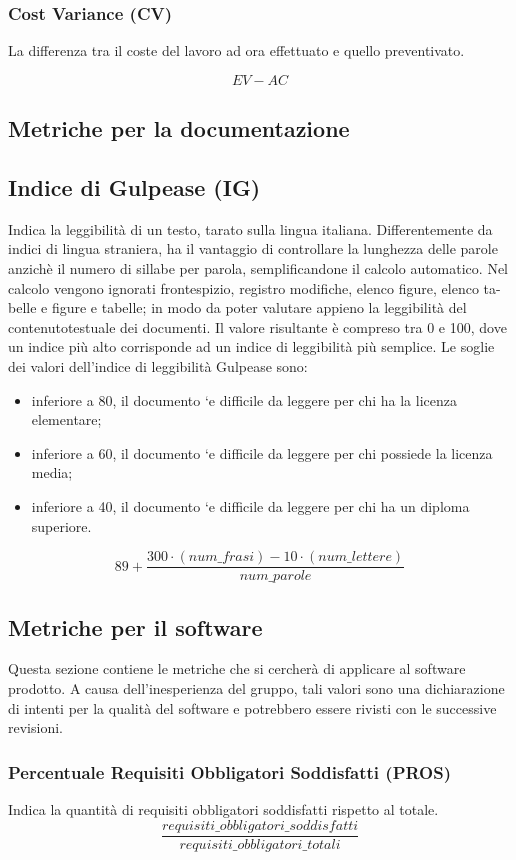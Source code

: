 \subsubsection{Cost Variance (CV)}
La differenza tra il coste del lavoro ad ora effettuato e quello preventivato.

\[
    EV-AC
\]

\subsection{Metriche per la documentazione}

\subsection{Indice di Gulpease (IG)}
Indica la leggibilità di un testo, tarato sulla lingua italiana. Differentemente da indici di lingua straniera, ha il vantaggio di controllare la lunghezza delle parole anzichè il numero di sillabe per parola, semplificandone il calcolo automatico. 
Nel calcolo vengono ignorati frontespizio, registro modifiche, elenco figure, elenco ta-belle e figure e tabelle; in modo da poter valutare appieno la leggibilità del contenutotestuale dei documenti.
Il valore risultante è compreso tra 0 e 100, dove un indice più alto corrisponde ad un indice di leggibilità più semplice.
Le soglie dei valori dell’indice di leggibilità Gulpease sono:
\begin{itemize}
    \item inferiore a 80, il documento `e difficile da leggere per chi ha la licenza elementare;
    \item inferiore a 60, il documento `e difficile da leggere per chi possiede la licenza media;
    \item inferiore a 40, il documento `e difficile da leggere per chi ha un diploma superiore.
\end{itemize}
\[
    89+ \frac{300\cdot (num\_frasi) - 10\cdot (num\_lettere)}{num\_parole}
\]

\subsection{Metriche per il software}
Questa sezione contiene le metriche che si cercherà di applicare al software prodotto. A causa dell’inesperienza del gruppo, tali valori sono una dichiarazione di intenti per la qualità del software e potrebbero essere rivisti con le successive revisioni.

\subsubsection{Percentuale Requisiti Obbligatori Soddisfatti (PROS)}
Indica la quantità di requisiti obbligatori soddisfatti rispetto al totale.
\[\frac{requisiti\_obbligatori\_soddisfatti}{requisiti\_obbligatori\_totali}\]

